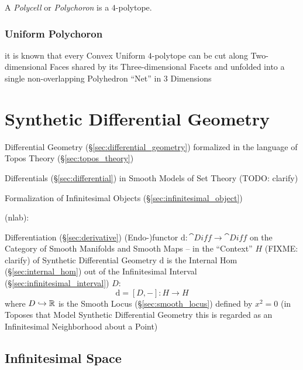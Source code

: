 A \emph{Polycell} or \emph{Polychoron} is a $4$-polytope.



\subsubsection{Uniform Polychoron}\label{sec:uniform_polychoron}

it is known that every Convex Uniform $4$-polytope can be cut along
Two-dimensional Faces shared by its Three-dimensional Facets and unfolded into
a single non-overlapping Polyhedron ``Net'' in $3$ Dimensions



\section{Synthetic Differential Geometry}
\label{sec:synthetic_differential_geometry}

Differential Geometry (\S\ref{sec:differential_geometry}) formalized in the
language of Topos Theory (\S\ref{sec:topos_theory})

Differentials (\S\ref{sec:differential}) in Smooth Models of Set Theory
(TODO: clarify)

Formalization of Infinitesimal Objects (\S\ref{sec:infinitesimal_object})

(nlab):

Differentiation (\S\ref{sec:derivative}) (Endo-)functor $\mathrm{d} : \cat{Diff}
\rightarrow \cat{Diff}$ on the Category of Smooth Manifolds and Smooth Maps --
in the ``Context'' $H$ (FIXME: clarify) of Synthetic Differential Geometry
$\mathrm{d}$ is the Internal Hom (\S\ref{sec:internal_hom}) out of the
Infinitesimal Interval (\S\ref{sec:infinitesimal_interval}) $D$:
\[
  \mathrm{d} = [D,-] : H \rightarrow H
\]
where $D \hookrightarrow \mathbb{R}$ is the Smooth Locus (\S\ref{sec:smooth_locus})
defined by $x^2 = 0$ (in Toposes that Model Synthetic Differential Geometry this
is regarded as an Infinitesimal Neighborhood about a Point)



\subsection{Infinitesimal Space}\label{sec:infinitesimal_space}

